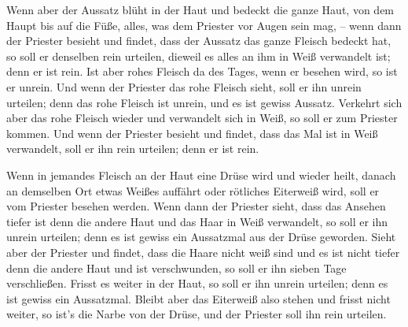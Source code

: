  Wenn aber der Aussatz blüht in der Haut und bedeckt die
ganze Haut, von dem Haupt bis auf die Füße, alles, was dem Priester vor
Augen sein mag, --  wenn dann der Priester besieht und
findet, dass der Aussatz das ganze Fleisch bedeckt hat, so soll er
denselben rein urteilen, dieweil es alles an ihm in Weiß verwandelt ist;
denn er ist rein.  Ist aber rohes Fleisch da des Tages,
wenn er besehen wird, so ist er unrein.  Und wenn der
Priester das rohe Fleisch sieht, soll er ihn unrein urteilen; denn das
rohe Fleisch ist unrein, und es ist gewiss Aussatz. 
Verkehrt sich aber das rohe Fleisch wieder und verwandelt sich in Weiß,
so soll er zum Priester kommen.  Und wenn der Priester
besieht und findet, dass das Mal ist in Weiß verwandelt, soll er ihn
rein urteilen; denn er ist rein.

 Wenn in jemandes Fleisch an der Haut eine Drüse wird und
wieder heilt,  danach an demselben Ort etwas Weißes
auffährt oder rötliches Eiterweiß wird, soll er vom Priester besehen
werden.  Wenn dann der Priester sieht, dass das Ansehen
tiefer ist denn die andere Haut und das Haar in Weiß verwandelt, so soll
er ihn unrein urteilen; denn es ist gewiss ein Aussatzmal aus der Drüse
geworden.  Sieht aber der Priester und findet, dass die
Haare nicht weiß sind und es ist nicht tiefer denn die andere Haut und
ist verschwunden, so soll er ihn sieben Tage verschließen.
 Frisst es weiter in der Haut, so soll er ihn unrein
urteilen; denn es ist gewiss ein Aussatzmal.  Bleibt aber
das Eiterweiß also stehen und frisst nicht weiter, so ist's die Narbe
von der Drüse, und der Priester soll ihn rein urteilen.

